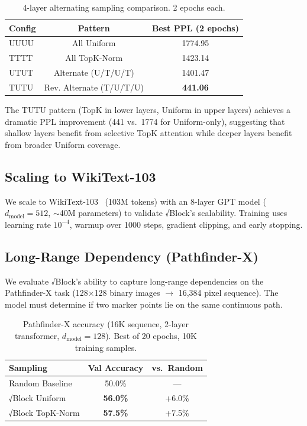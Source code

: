 \documentclass[11pt,a4paper]{article}
\begin{document}
\begin{table}[h]
\centering
\caption{4-layer alternating sampling comparison. 2 epochs each.}
\label{tab:alternating}
\begin{tabular}{lcc}
\toprule
Config & Pattern & Best PPL (2 epochs) \\
\midrule
UUUU & All Uniform          & 1774.95 \\
TTTT & All TopK-Norm        & 1423.14 \\
UTUT & Alternate (U/T/U/T)  & 1401.47 \\
TUTU & Rev. Alternate (T/U/T/U) & \textbf{441.06} \\
\bottomrule
\end{tabular}
\end{table}

The TUTU pattern (TopK in lower layers, Uniform in upper layers) achieves a dramatic PPL improvement (441 vs.\ 1774 for Uniform-only), suggesting that shallow layers benefit from selective TopK attention while deeper layers benefit from broader Uniform coverage.

\subsection{Scaling to WikiText-103}

We scale to WikiText-103~\cite{merity2016pointer} (103M tokens) with an 8-layer GPT model ($d_{\text{model}}=512$, $\sim$40M parameters) to validate √Block's scalability. Training uses learning rate $10^{-4}$, warmup over 1000 steps, gradient clipping, and early stopping.

\subsection{Long-Range Dependency (Pathfinder-X)}

We evaluate √Block's ability to capture long-range dependencies on the Pathfinder-X task (128$\times$128 binary images $\rightarrow$ 16,384 pixel sequence). The model must determine if two marker points lie on the same continuous path.

\begin{table}[h]
\centering
\caption{Pathfinder-X accuracy (16K sequence, 2-layer transformer, $d_{\text{model}}=128$). Best of 20 epochs, 10K training samples.}
\label{tab:lra}
\begin{tabular}{lcc}
\toprule
Sampling & Val Accuracy & vs.\ Random \\
\midrule
Random Baseline & 50.0\% & --- \\
√Block Uniform  & \textbf{56.0\%} & +6.0\% \\
√Block TopK-Norm & \textbf{57.5\%} & +7.5\% \\
\bottomrule
\end{tabular}
\end{table}
\end{document}
